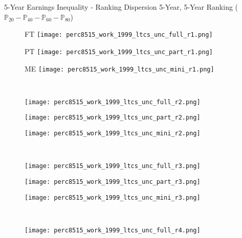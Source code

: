 \documentclass[hyperref={bookmarks=false}]{beamer}
\begin{document}
\begin{appendix}
\begin{frame}{5-Year Earnings Inequality - Ranking}
Dispersion 5-Year, 5-Year Ranking ($\mathbb{P}_{20}-\mathbb{P}_{40}-\mathbb{P}_{60}-\mathbb{P}_{80}$)
\begin{figure}[!t]
\begin{minipage}[b]{0.15\textwidth}{FT}
\centering
\texttt{[image: perc8515\_work\_1999\_ltcs\_unc\_full\_r1.png]}
\end{minipage}
\begin{minipage}[b]{0.15\textwidth}{PT}
\centering
\texttt{[image: perc8515\_work\_1999\_ltcs\_unc\_part\_r1.png]}
\end{minipage}
\begin{minipage}[b]{0.15\textwidth}{ME}
\centering
\texttt{[image: perc8515\_work\_1999\_ltcs\_unc\_mini\_r1.png]}
\end{minipage}\\
\begin{minipage}[b]{0.15\textwidth}{}
\centering
\texttt{[image: perc8515\_work\_1999\_ltcs\_unc\_full\_r2.png]}
\end{minipage}
\begin{minipage}[b]{0.15\textwidth}{}
\centering
\texttt{[image: perc8515\_work\_1999\_ltcs\_unc\_part\_r2.png]}
\end{minipage}
\begin{minipage}[b]{0.15\textwidth}{}
\centering
\texttt{[image: perc8515\_work\_1999\_ltcs\_unc\_mini\_r2.png]}
\end{minipage}\\
\begin{minipage}[b]{0.15\textwidth}{}
\centering
\texttt{[image: perc8515\_work\_1999\_ltcs\_unc\_full\_r3.png]}
\end{minipage}
\begin{minipage}[b]{0.15\textwidth}{}
\centering
\texttt{[image: perc8515\_work\_1999\_ltcs\_unc\_part\_r3.png]}
\end{minipage}
\begin{minipage}[b]{0.15\textwidth}{}
\centering
\texttt{[image: perc8515\_work\_1999\_ltcs\_unc\_mini\_r3.png]}
\end{minipage}\\
\begin{minipage}[b]{0.15\textwidth}{}
\centering
\texttt{[image: perc8515\_work\_1999\_ltcs\_unc\_full\_r4.png]}
\end{minipage}
\begin{minipage}[b]{0.15\textwidth}{}

\end{minipage}
\end{figure}
\end{frame}
\end{appendix}
\end{document}
